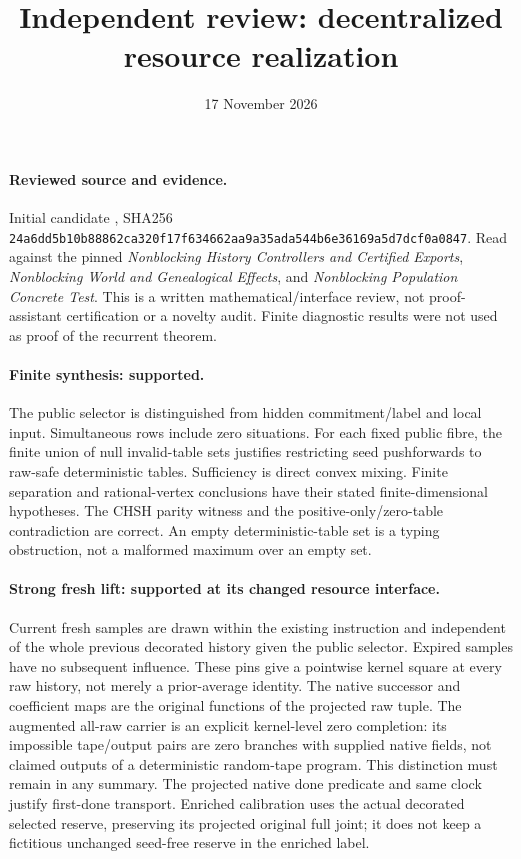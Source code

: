 \documentclass{article}\usepackage{amsmath,amssymb,url}
\title{Independent review: decentralized resource realization}\author{}\date{17 November 2026}
\begin{document}
\maketitle
\paragraph{Reviewed source and evidence.} Initial candidate , SHA256 \texttt{24a6dd5b10b88862ca320f17f634662aa9a35ada544b6e36169a5d7dcf0a0847}. Read against the pinned \emph{Nonblocking History Controllers and Certified Exports}, \emph{Nonblocking World and Genealogical Effects}, and \emph{Nonblocking Population Concrete Test}. This is a written mathematical/interface review, not proof-assistant certification or a novelty audit. Finite diagnostic results were not used as proof of the recurrent theorem.

\paragraph{Finite synthesis: supported.} The public selector is distinguished from hidden commitment/label and local input. Simultaneous rows include zero situations. For each fixed public fibre, the finite union of null invalid-table sets justifies restricting seed pushforwards to raw-safe deterministic tables. Sufficiency is direct convex mixing. Finite separation and rational-vertex conclusions have their stated finite-dimensional hypotheses. The CHSH parity witness and the positive-only/zero-table contradiction are correct. An empty deterministic-table set is a typing obstruction, not a malformed maximum over an empty set.

\paragraph{Strong fresh lift: supported at its changed resource interface.} Current fresh samples are drawn within the existing instruction and independent of the whole previous decorated history given the public selector. Expired samples have no subsequent influence. These pins give a pointwise kernel square at every raw history, not merely a prior-average identity. The native successor and coefficient maps are the original functions of the projected raw tuple. The augmented all-raw carrier is an explicit kernel-level zero completion: its impossible tape/output pairs are zero branches with supplied native fields, not claimed outputs of a deterministic random-tape program. This distinction must remain in any summary. The projected native done predicate and same clock justify first-done transport. Enriched calibration uses the actual decorated selected reserve, preserving its projected original full joint; it does not keep a fictitious unchanged seed-free reserve in the enriched label.
\end{document}
